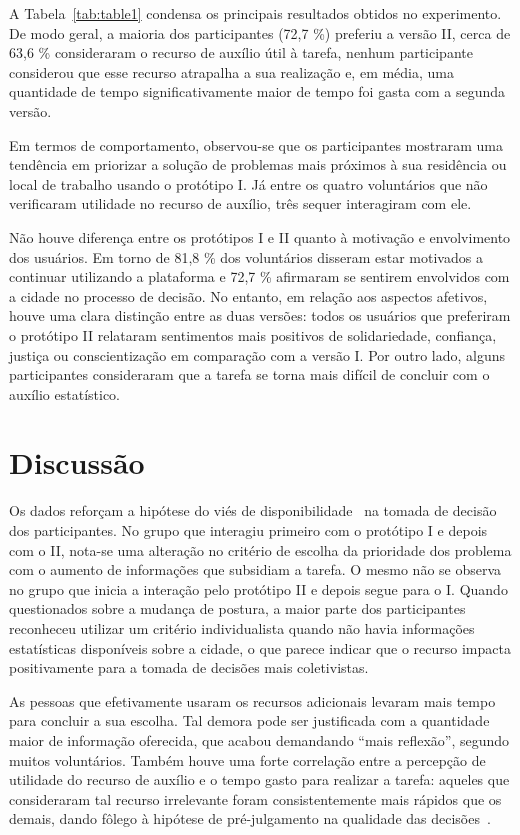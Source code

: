 \documentclass{sigchi}
\begin{document}
A Tabela~\ref{tab:table1} condensa os principais resultados obtidos no experimento. De modo geral, a maioria dos participantes (72,7 \%) preferiu a versão II, cerca de 63,6 \% consideraram o recurso de auxílio útil à tarefa, nenhum participante considerou que esse recurso atrapalha a sua realização e, em média, uma quantidade de tempo significativamente maior de tempo foi gasta com a segunda versão.

Em termos de comportamento, observou-se que os participantes mostraram uma tendência em priorizar a solução de problemas mais próximos à sua residência ou local de trabalho usando o protótipo I. Já entre os quatro voluntários que não verificaram utilidade no recurso de auxílio, três sequer interagiram com ele.

Não houve diferença entre os protótipos I e II quanto à motivação e envolvimento dos usuários. Em torno de 81,8 \% dos voluntários disseram estar motivados a continuar utilizando a plataforma e 72,7 \% afirmaram se sentirem envolvidos com a cidade no processo de decisão. No entanto, em relação aos aspectos afetivos, houve uma clara distinção entre as duas versões: todos os usuários que preferiram o protótipo II relataram sentimentos mais positivos de solidariedade, confiança, justiça ou conscientização em comparação com a versão I. Por outro lado, alguns participantes consideraram que a tarefa se torna mais difícil de concluir com o auxílio estatístico.


\section{Discussão}
Os dados reforçam a hipótese do viés de disponibilidade~\cite{tversky:1973} na tomada de decisão dos participantes. No grupo que interagiu primeiro com o protótipo I e depois com o II, nota-se uma alteração no critério de escolha da prioridade dos problema com o aumento de informações que subsidiam a tarefa. O mesmo não se observa no grupo que inicia a interação pelo protótipo II e depois segue para o I. Quando questionados sobre a mudança de postura, a maior parte dos participantes reconheceu utilizar um critério individualista quando não havia informações estatísticas disponíveis sobre a cidade, o que parece indicar que o recurso impacta positivamente para a tomada de decisões mais coletivistas.

As pessoas que efetivamente usaram os recursos adicionais levaram mais tempo para concluir a sua escolha. Tal demora pode ser justificada com a quantidade maior de informação oferecida, que acabou demandando ``mais reflexão'', segundo muitos voluntários. Também houve uma forte correlação entre a percepção de utilidade do recurso de auxílio e o tempo gasto para realizar a tarefa: aqueles que consideraram tal recurso irrelevante foram consistentemente mais rápidos que os demais, dando fôlego à hipótese de pré-julgamento na qualidade das decisões~\cite{tversky:1986}.
\end{document}
